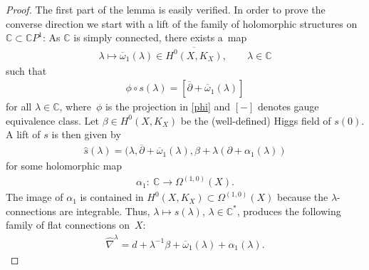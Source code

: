 \begin{proof}
The f\/irst part of the lemma is easily verif\/ied. In order to prove the converse direction we start with a lift of the family of holomorphic structures on ${\mathbb C} \subset {\mathbb C}P^1$: As $\mathbb C$ is simply connected, there exists a~map
\begin{gather*}
\lambda \longmapsto \overline{\omega}_1(\lambda) \in \overline{H^0(X, K_X)} , \qquad \lambda \in \mathbb C\end{gather*}
such that \begin{gather*}\phi\circ s(\lambda) = [\overline{\partial}+\overline{\omega}_1(\lambda)]\end{gather*}
for all $\lambda \in {\mathbb C}$, where~$\phi$ is the projection in \eqref{phi} and $[-]$ denotes gauge equivalence class. Let $\beta \in H^0(X, K_X)$ be the (well-def\/ined) Higgs f\/ield of $s(0)$. A lift of $s$ is then given by
\begin{gather*}\widehat{s} (\lambda) = (\lambda,\overline{\partial}+\overline{\omega}_1(\lambda), \beta+\lambda(\partial+\alpha_1(\lambda))\end{gather*}
for some holomorphic map \begin{gather*}\alpha_1 \colon \ \mathbb C \longrightarrow \Omega^{(1,0)}(X) .\end{gather*} The image of $\alpha_1$ is contained in $H^0(X, K_X) \subset \Omega^{(1,0)}(X)$ because the $\lambda$-connections are integrable. Thus, $\lambda \longmapsto s(\lambda)$, $\lambda \in \mathbb C^*$, produces the following family of f\/lat connections on~$X$:
\begin{gather*}\widehat{\nabla}^\lambda = d+\lambda^{-1}\beta+\overline{\omega}_1(\lambda)+ \alpha_1(\lambda) .\end{gather*}


\end{proof}
